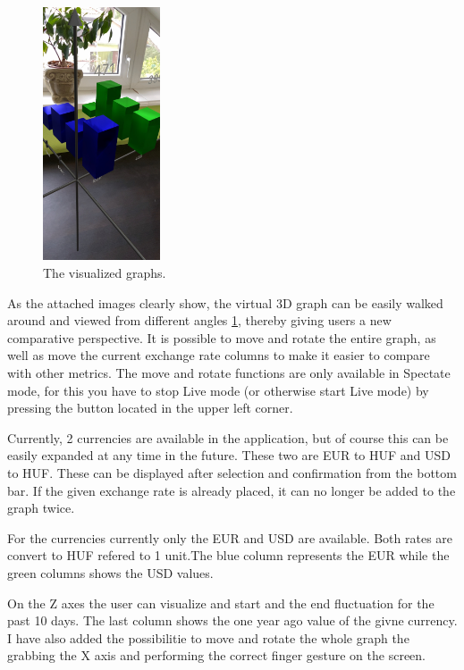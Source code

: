 \documentclass[a4paper,oneside]{article}
\begin{document}
\begin{figure}[!ht]
  \centering
  \includegraphics[height=75mm, keepaspectratio]{../images/top.jpeg}
  \caption{The visualized graphs.}
  \label{fig:top}
\end{figure}

As the attached images clearly show, the virtual 3D graph can be easily walked around and viewed from different angles \ref{fig:top}, thereby giving users a new comparative perspective. It is possible to move and rotate the entire graph, as well as move the current exchange rate columns to make it easier to compare with other metrics. The move and rotate functions are only available in Spectate mode, for this you have to stop Live mode (or otherwise start Live mode) by pressing the button located in the upper left corner.

Currently, 2 currencies are available in the application, but of course this can be easily expanded at any time in the future. These two are EUR to HUF and USD to HUF. These can be displayed after selection and confirmation from the bottom bar. If the given exchange rate is already placed, it can no longer be added to the graph twice.

For the currencies currently only the EUR and USD are available. Both rates are convert to HUF refered to 1 unit.The blue column represents the EUR while the green columns shows the USD values.

On the Z axes the user can visualize and start and the end fluctuation for the past 10 days. The last column shows the one year ago value of the givne currency.
I have also added the possibilitie to move and rotate the whole graph the grabbing the X axis and performing the correct finger gesture on the screen.
\end{document}
